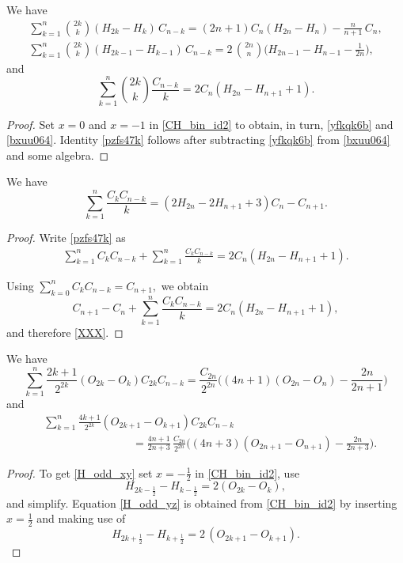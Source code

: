 \documentclass[12pt,reqno]{article}
\begin{document}
\begin{corollary}
	We have
	\begin{gather}\label{yfkqk6b}
	\sum_{k=1}^n \binom{2k}{k} (H_{2k} - H_{k}) \,C_{n-k} = (2n+1) C_n (H_{2n} - H_{n}) - \frac{n}{n+1}\, C_n,\\
	\label{bxuu064}
	\sum_{k=1}^n \binom{2k}{k} (H_{2k-1} - H_{k-1})\, C_{n-k} = 2 \,\binom{2n}{n} \Big ( H_{2n-1} - H_{n-1} - \frac{1}{2n} \Big ),
	\end{gather}
	and
	\begin{equation}\label{pzfs47k}
	\sum_{k = 1}^n \binom{2k}{k} \frac{C_{n - k}}{k} = 2C_n (H_{2n} - H_{n + 1} + 1 ).
	\end{equation}
\end{corollary}
\begin{proof}
Set $x=0$ and $x=-1$ in \eqref{CH_bin_id2} to obtain, in turn, \eqref{yfkqk6b} and \eqref{bxuu064}. 
Identity \eqref{pzfs47k} follows after subtracting \eqref{yfkqk6b} from \eqref{bxuu064} and some algebra.
\end{proof}
\begin{corollary}
We  have
\begin{equation}\label{XXX}
\sum_{k = 1}^n \frac{C_k C_{n - k}}{k} = \left(2H_{2n} - 2H_{n + 1} + 3 \right)C_n - C_{n+1}.
\end{equation}
\end{corollary}
\begin{proof} 
Write \eqref{pzfs47k} as 
\begin{gather*}
\sum_{k = 1}^n C_k C_{n - k} + \sum_{k = 1}^n \frac{C_k C_{n - k}}{k} = 2C_n (H_{2n} - H_{n + 1} + 1 ).
\end{gather*}

Using
$ \sum\limits_{k=0}^n C_kC_{n-k}=C_{n+1}, 
$ we obtain \[ C_{n+1}-C_n + \sum_{k=1}^n\frac{C_kC_{n-k}}{k} = 2C_n(H_{2n}-H_{n+1}+1), \] 
and therefore \eqref{XXX}.
\end{proof}
\begin{corollary}
	We have
	\begin{equation}\label{H_odd_xy}
	\sum_{k=1}^n \frac{2k+1}{2^{2k}} (O_{2k} - O_{k}) C_{2k}C_{n-k} =  \frac{C_{2n}}{2^{2n}} \Big ( (4n+1)(O_{2n} - O_{n}) - \frac{2n}{2n+1} \Big)
	\end{equation}
	and
	\begin{align}\label{H_odd_yz}
	&\sum_{k=1}^n \frac{4k+1}{2^{2k}} (O_{2k+1} - O_{k+1}) C_{2k}C_{n-k} \nonumber \\
	&\qquad\qquad\qquad\qquad =  \frac{4n+1}{2n+3}\, \frac{C_{2n}}{{2^{2n}}}\Big( (4n+3) (O_{2n+1} - O_{n+1}) - \frac{2n}{2n+3} \Big).
	\end{align}
\end{corollary}
\begin{proof}
	To get \eqref{H_odd_xy} set $x=-\frac12$ in \eqref{CH_bin_id2}, use
	$$H_{2k-\frac12} - H_{k-\frac12} = 2(O_{2k} - O_{k}),$$
	and simplify. Equation \eqref{H_odd_yz} is obtained from \eqref{CH_bin_id2} by inserting $x=\frac12$ and making use of
	$$H_{2k+\frac12} - H_{k+\frac12} = 2\,(O_{2k+1} - O_{k+1}).$$
\end{proof}
\end{document}
